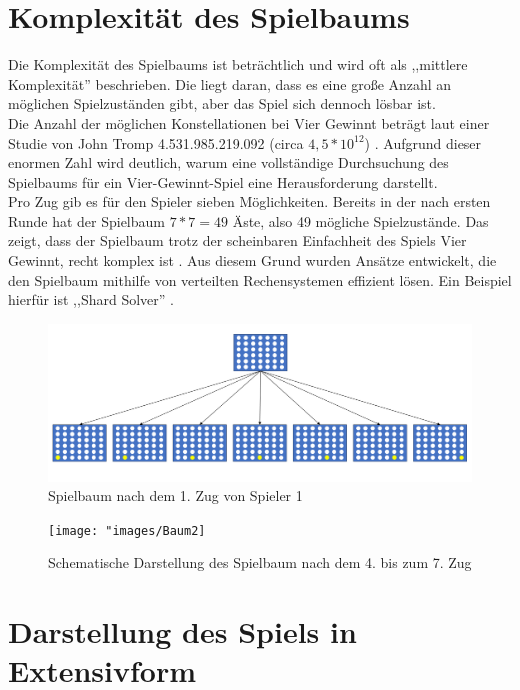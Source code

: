 \section{Komplexität des Spielbaums}
Die Komplexität des Spielbaums ist beträchtlich und wird oft als ,,mittlere Komplexität'' beschrieben. Die liegt daran, dass es eine große Anzahl an möglichen Spielzuständen gibt, aber das Spiel sich dennoch lösbar ist.\\
Die Anzahl der möglichen Konstellationen bei Vier Gewinnt beträgt laut einer Studie von John Tromp 4.531.985.219.092 (circa $4,5*10^{12}$) \autocite{thill2012reinforcement}. Aufgrund dieser enormen Zahl wird deutlich, warum eine vollständige Durchsuchung des Spielbaums für ein Vier-Gewinnt-Spiel eine Herausforderung darstellt.\\
Pro Zug gib es für den Spieler sieben Möglichkeiten. Bereits in der nach ersten Runde hat der Spielbaum $7*7 = 49$ Äste, also 49 mögliche Spielzustände. Das zeigt, dass der Spielbaum trotz der scheinbaren Einfachheit des Spiels Vier Gewinnt, recht komplex ist \autocite{thill2012reinforcement}\autocite{ruile2009viergewinnt}. Aus diesem Grund wurden Ansätze entwickelt, die den Spielbaum mithilfe von verteilten Rechensystemen effizient lösen. Ein Beispiel hierfür ist ,,Shard Solver'' \autocite{yokota2022exploration}.


\begin{figure}[H]
	\centering
	\includegraphics[width=0.9\linewidth]{"images/Baum1"}
	\caption[Spielbaum nach der 2. Tiefe]{Spielbaum nach dem 1. Zug von Spieler 1}
	\label{fig:baum1}
\end{figure}

\begin{figure}[H]
	\centering
	\texttt{[image: "images/Baum2]}
	\caption[Spielbaum nach dem 4. Zug. Quelle: \cite{vandewiele2017}]{Schematische Darstellung des Spielbaum nach dem 4. bis zum 7. Zug}
	\label{fig:Baum2}
\end{figure}



 \section{Darstellung des Spiels in Extensivform}

